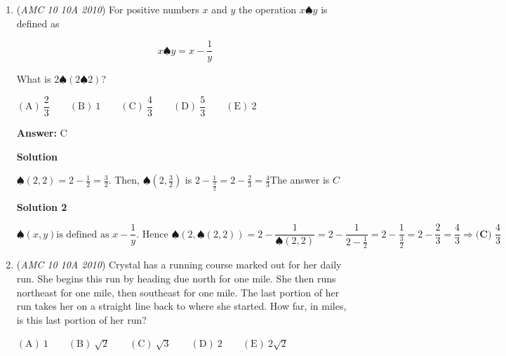 \begin{enumerate}
 


 



\textbf{Solution 2}

By definition, $\pi$ is the ratio of the circumference to the diameter. Since the circumference is $24\pi$, the diameter must be $24$ and the radius is $12$. Therefore, by the area of circle formula $A=\pi r^{2}$ the area is $12^{2}\pi=144\pi$ and $k=144 \Longrightarrow \boxed{\textbf{(E)} 144}$.

 


	\item (\textit{AMC 10 10A 2010}) For positive numbers $x$ and $y$ the operation $x\spadesuit y$ is defined as 


 
 \[x\spadesuit y = x -\dfrac{1}{y}\]


 What is $2\spadesuit (2\spadesuit 2)$?


 $\mathrm{(A)}\ \dfrac{2}{3} \qquad \mathrm{(B)}\ 1 \qquad \mathrm{(C)}\ \dfrac{4}{3} \qquad \mathrm{(D)}\ \dfrac{5}{3} \qquad \mathrm{(E)}\ 2$

 \textbf{Answer: }C



\textbf{Solution}

$\spadesuit (2,2) =2-\frac{1}{2} =\frac{3}{2}$. Then, $\spadesuit \left(2,\frac{3}{2}\right)$ is $2-\frac{1}{\frac{3}{2}} = 2- \frac{2}{3} = \frac{4}{3}$The answer is $\boxed{C}$




\textbf{Solution 2}


 \[\spadesuit (x, y) \text{is defined as } x - \frac{1}{y} \text{. Hence } \spadesuit (2,\spadesuit(2, 2)) =2 - \frac{1}{\spadesuit (2, 2)} =  2 - \frac{1}{2 - \frac{1}{2}}=2-\frac{1}{\frac{3}{2}}=2-\frac{2}{3}=\frac{4}{3}\Longrightarrow \boxed{\textbf{(C) } \frac{4}{3}}\]



	\item (\textit{AMC 10 10A 2010}) Crystal has a running course marked out for her daily run. She begins this run by heading due north for one mile. She then runs northeast for one mile, then southeast for one mile. The last portion of her run takes her on a straight line back to where she started. How far, in miles, is this last portion of her run?


 $\mathrm{(A)}\ 1 \qquad \mathrm{(B)}\ \sqrt{2} \qquad \mathrm{(C)}\ \sqrt{3} \qquad \mathrm{(D)}\ 2 \qquad \mathrm{(E)}\ 2\sqrt{2}$


\end{enumerate}

